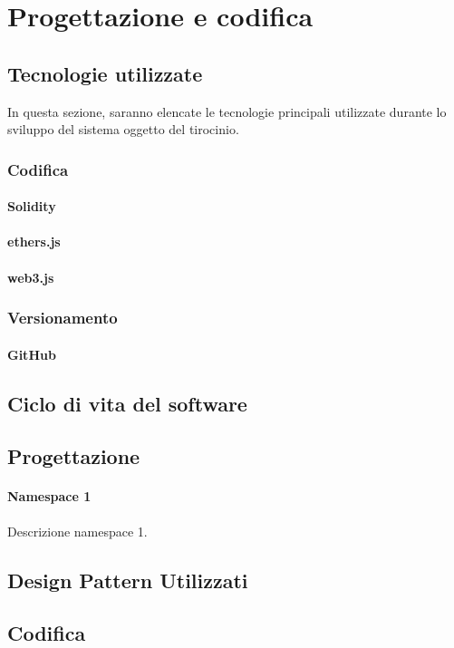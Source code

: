 \chapter{Progettazione e codifica}\label{cap:progettazione-codifica}


\section{Tecnologie utilizzate}\label{sec:tecnologie-strumenti}

In questa sezione, saranno elencate le tecnologie principali utilizzate durante lo sviluppo del sistema oggetto del tirocinio.

\subsection{Codifica}
\subsubsection{Solidity}

\subsubsection{ethers.js}

\subsubsection{web3.js}

\subsection{Versionamento}
\subsubsection{GitHub}

\section{Ciclo di vita del software}\label{sec:ciclo-vita-software}

\section{Progettazione}\label{sec:progettazione}

\subsubsection{Namespace 1} %
Descrizione namespace 1.

\begin{namespacedesc}
\end{namespacedesc}


\section{Design Pattern Utilizzati}

\section{Codifica}
